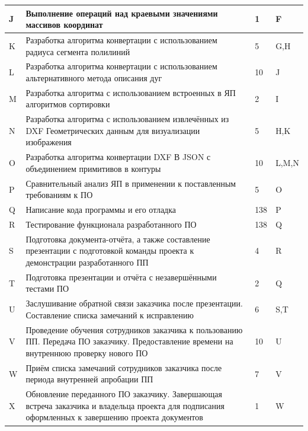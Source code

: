 \begin{longtable}{|m{}|p{}|m{}|m{}|}
	J&Выполнение операций над краевыми значениями массивов координат&1&F\\ \hline
	K&Разработка алгоритма конвертации с использованием радиуса сегмента полилиний&5&G,H\\ \hline
	L&Разработка алгоритма конвертации с использованием альтернативного метода описания дуг&10&J\\ \hline
	M&Разработка алгоритма с использованием встроенных в ЯП алгоритмов сортировки&2&I\\ \hline
	N&Разработка алгоритма с использованием извлечённых из DXF Геометрических данным для визуализации изображения&5&H,K\\ \hline
	O&Разработка алгоритма конвертации DXF В JSON с объединением примитивов в контуры&10&L,M,N\\ \hline
	P&Сравнительный анализ ЯП в применении к поставленным требованиям к ПО&5&O\\ \hline
	Q&Написание кода программы и его отладка&138&P\\ \hline
	R&Тестирование функционала разработанного ПО&138&Q\\ \hline
	S&Подготовка документа-отчёта, а также составление презентации с подготовкой команды проекта к демонстрации разработанного ПП&4&R\\ \hline
	T&Подготовка презентации и отчёта с незавершёнными тестами ПО&2&Q\\ \hline
	U&Заслушивание обратной связи заказчика после презентации. Составление списка замечаний к исправлению&6&S,T\\ \hline
	V&Проведение обучения сотрудников заказчика к пользованию ПП. Передача ПО заказчику. Предоставление времени на внутреннюю проверку нового ПО&10&U\\ \hline
	W&Приём списка замечаний сотрудников заказчика после периода внутренней апробации ПП&7&V\\ \hline
	X&Обновление переданного ПО заказчику. Завершающая встреча заказчика и владельца проекта для подписания оформленных к завершению проекта документов&1&W\\ \hline
\end{longtable}

